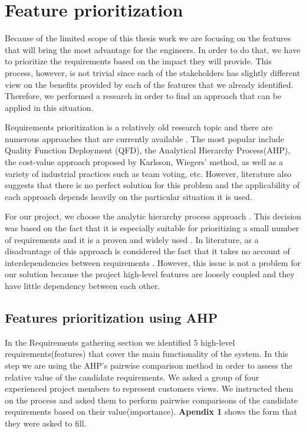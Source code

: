 \section{Feature prioritization}

Because of the limited scope of this thesis work we are focusing on the features that will bring the most advantage for the engineers. In order to do that, we have to prioritize the requirements based on the impact they will provide. This process, however, is not trivial since each of the stakeholders has slightly different view on the benefits provided by each of the features that we already identified. Therefore, we performed a research in order to find an approach that can be applied in this situation.

Requirements prioritization is a relatively old research topic and there are numerous approaches that are currently available \cite{moisiadis2002fundamentals}. The most popular include Quality Function Deployment (QFD), the Analytical Hierarchy Process(AHP), the cost-value approach proposed by Karlsson, Wiegers' method, as well as a variety of industrial practices such as team voting, etc. However, literature also suggests that there is no perfect solution for this problem and the applicability of each approach depends heavily on the particular situation it is used.

For our project, we choose the analytic hierarchy process approach \cite{roper1990analytic} . This decision was based on the fact that it is especially suitable for prioritizing a small number of requirements\cite{karlsson1997cost} and it is a proven and widely used \cite{karlsson1998evaluation}. In literature, as a disadvantage of this approach is considered the fact that it takes no account of interdependencies between requirements \cite{roper1990analytic}. However, this issue is not a problem for our solution because the project high-level features are loosely coupled and they have little dependency between each other. 


\subsection{Features prioritization using AHP}
In the Requirements gathering section we identified 5 high-level requirements(features) that cover the main functionality of the system. In this step we are using the AHP's pairwise comparison method in order to assess the relative value of the candidate requirements. We asked a group of four experienced project members to represent customers views. We instructed them on the process and asked them to perform  pairwise comparisons of the candidate requirements based on their value(importance). \textbf{Apendix 1} shows the form that they were asked to fill.

